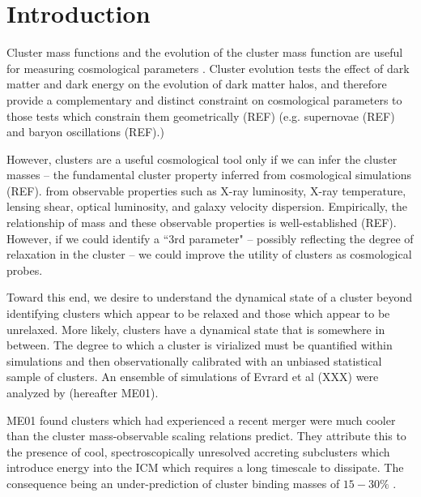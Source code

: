 \documentclass{emulateapj}
\begin{document}


\section{Introduction}\label{sec:intro}

Cluster mass functions and the evolution of the cluster mass function
are useful for measuring cosmological parameters
\citep{1989ApJ...341L..71E, 1998ApJ...508..483W, 2001ApJ...553..545H,
2003PhRvD..67h1304H, 2004PhRvD..70l3008W}. Cluster evolution tests
 the effect of dark matter and dark energy on the evolution of dark matter 
 halos, and therefore provide a complementary and distinct constraint 
 on cosmological parameters to those tests which constrain them geometrically (REF)
 (e.g. supernovae (REF) and baryon oscillations (REF).)

However, clusters are a useful
cosmological tool only if we can infer the cluster masses -- the fundamental
cluster property inferred from cosmological simulations (REF).
from observable properties such as X-ray luminosity, X-ray temperature,
lensing shear, optical luminosity, and galaxy velocity dispersion.
Empirically, the relationship of mass and these observable properties
is well-established (REF). However, if we could identify a 
 ``3rd parameter" -- possibly reflecting the degree of relaxation in the 
 cluster -- we could improve the utility of clusters as cosmological 
 probes.

Toward this end, we desire to understand the dynamical state of a cluster
beyond identifying clusters which appear to be relaxed and those which
appear to be unrelaxed.
More likely, clusters have a dynamical
state that is somewhere in between.
The degree to which a cluster is virialized must be quantified within
simulations and then observationally calibrated with an unbiased
statistical sample of clusters. An ensemble of simulations of Evrard et al (XXX)
were analyzed by  
\cite{2001ApJ...546..100M} (hereafter ME01). 


ME01 found clusters which had experienced a recent
merger were much cooler  than the cluster mass-observable scaling
relations predict. They attribute this to the presence of cool,
spectroscopically unresolved accreting subclusters which introduce
energy into the ICM which requires a long timescale to
dissipate. The consequence being an under-prediction
of cluster binding masses of $15-30\%$ \citep{2001ApJ...546..100M}.
\end{document}
